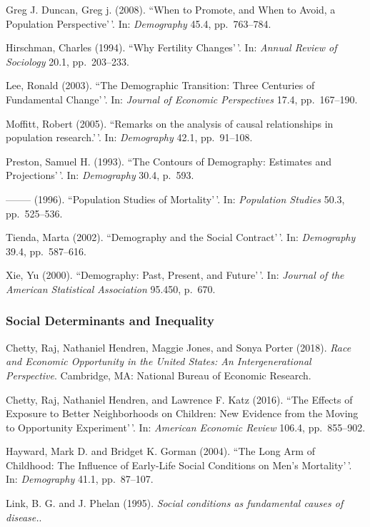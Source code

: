 \documentclass[11pt,]{article}
\begin{document}
Greg J. Duncan, Greg j. (2008). ``When to Promote, and When to Avoid, a
Population Perspective'\,'. In: \emph{Demography} 45.4, pp.~763--784.

Hirschman, Charles (1994). ``Why Fertility Changes'\,'. In:
\emph{Annual Review of Sociology} 20.1, pp.~203--233.

Lee, Ronald (2003). ``The Demographic Transition: Three Centuries of
Fundamental Change'\,'. In: \emph{Journal of Economic Perspectives}
17.4, pp.~167--190.

Moffitt, Robert (2005). ``Remarks on the analysis of causal
relationships in population research.'\,'. In: \emph{Demography} 42.1,
pp.~91--108.

Preston, Samuel H. (1993). ``The Contours of Demography: Estimates and
Projections'\,'. In: \emph{Demography} 30.4, p.~593.

-------- (1996). ``Population Studies of Mortality'\,'. In:
\emph{Population Studies} 50.3, pp.~525--536.

Tienda, Marta (2002). ``Demography and the Social Contract'\,'. In:
\emph{Demography} 39.4, pp.~587--616.

Xie, Yu (2000). ``Demography: Past, Present, and Future'\,'. In:
\emph{Journal of the American Statistical Association} 95.450, p.~670.

\hypertarget{social-determinants-and-inequality}{%
\subsubsection{Social Determinants and
Inequality}\label{social-determinants-and-inequality}}

Chetty, Raj, Nathaniel Hendren, Maggie Jones, and Sonya Porter (2018).
\emph{Race and Economic Opportunity in the United States: An Intergenerational Perspective}.
Cambridge, MA: National Bureau of Economic Research.

Chetty, Raj, Nathaniel Hendren, and Lawrence F. Katz (2016). ``The
Effects of Exposure to Better Neighborhoods on Children: New Evidence
from the Moving to Opportunity Experiment'\,'. In:
\emph{American Economic Review} 106.4, pp.~855--902.

Hayward, Mark D. and Bridget K. Gorman (2004). ``The Long Arm of
Childhood: The Influence of Early-Life Social Conditions on Men's
Mortality'\,'. In: \emph{Demography} 41.1, pp.~87--107.

Link, B. G. and J. Phelan (1995).
\emph{Social conditions as fundamental causes of disease.}.
\end{document}
